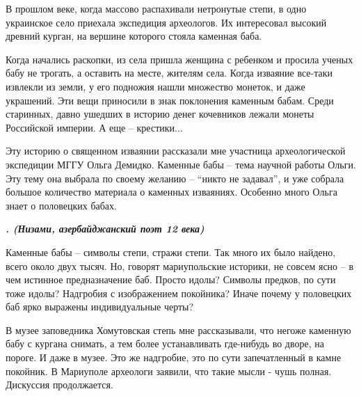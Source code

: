  
 
 
 
 

В прошлом веке, когда массово распахивали нетронутые степи, в одно украинское
село приехала экспедиция археологов. Их интересовал высокий древний курган, на
вершине которого стояла каменная баба.

Когда начались раскопки, из села пришла женщина с ребенком и просила ученых
бабу не трогать, а оставить на месте, жителям села. Когда изваяние все-таки
извлекли из земли, у его подножия нашли множество монеток, и даже украшений.
Эти вещи приносили в знак поклонения каменным бабам. Среди старинных, давно
ушедших в историю денег кочевников лежали монеты Российской империи. А еще –
крестики...

Эту историю о священном изваянии рассказали мне участница археологической
экспедиции МГГУ Ольга Демидко. Каменные бабы – тема научной работы Ольги. Эту
тему она выбрала по своему желанию – \enquote{никто не задавал}, и уже собрала большое
количество материала о каменных изваяниях. Особенно много Ольга знает о
половецких бабах.

\begin{center}
  \em\color{blue}\bfseries\Large
{}. (Низами, азербайджанский поэт 12 века)
\end{center}

Каменные бабы – символы степи, стражи степи. Так много их было найдено, всего
около двух тысяч. Но, говорят мариупольские историки, не совсем ясно – в чем
истинное предназначение баб. Просто идолы? Символы предков, по сути тоже идолы?
Надгробия с изображением покойника? Иначе почему у половецких баб ярко выражены
индивидуальные черты?

В музее заповедника Хомутовская степь мне рассказывали, что негоже каменную
бабу с кургана снимать, а тем более устанавливать где-нибудь во дворе, на
пороге. И даже в музее. Это же надгробие, это по сути запечатленный в камне
покойник. В Мариуполе археологи заявили, что такие мысли - чушь полная.
Дискуссия продолжается.
